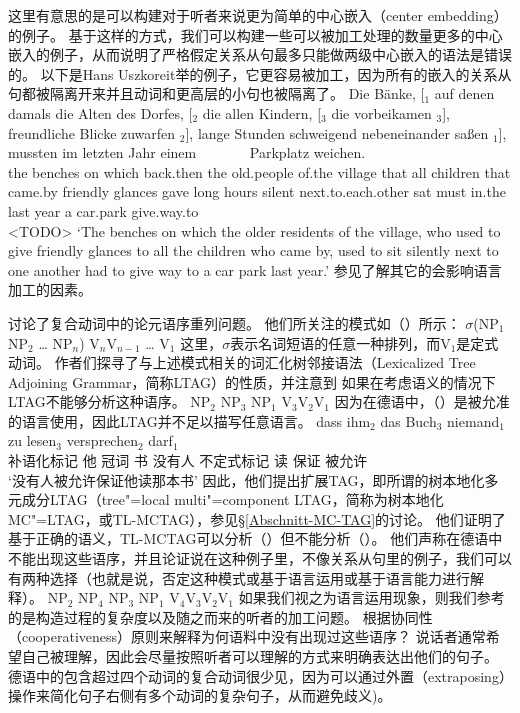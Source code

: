 \noindent
这里有意思的是可以构建对于听者来说更为简单的中心嵌入（center embedding）的例子。
基于这样的方式，我们可以构建一些可以被加工处理的数量更多的中心嵌入的例子，从而说明了严格假定关系从句最多只能做两级中心嵌入的语法是错误的。
以下是Hans Uszkoreit举的例子，它更容易被加工，因为所有的嵌入的关系从句都被隔离开来并且动词和更高层的小句也被隔离了。
\ea
\gll Die Bänke, [$_1$ auf denen damals die Alten des Dorfes, [$_2$ die allen Kindern, [$_3$ die vorbeikamen $_3$], freundliche Blicke zuwarfen $_2$], 
lange Stunden schweigend nebeneinander saßen $_1$], mussten im letzten Jahr einem~~~~~~~ Parkplatz weichen.\\
the benches {} on which back.then the old.people of.the village {} that all children {} that came.by {} friendly glances gave {}
long hours silent next.to.each.other sat {} must in.the last year a car.park give.way.to\\
<TODO>%
\glt `The benches on which the older residents of the village, who used to give friendly glances to all the children who came by, used to sit silently next to one 
another had to give way to a car park last year.'
\z
参见了解其它的会影响语言加工的因素。

\addlines
\citet{JBR2000a}讨论了复合动词中的论元语序重列问题。
他们所关注的模式如（）所示：
\ea
$\sigma$(NP$_1$ NP$_2$ \ldots{} NP$_n$) V$_{n}$V$_{n-1}$ \ldots{} V$_{1}$
\z
这里，$\sigma$表示名词短语的任意一种排列，而V$_{1}$是定式动词。
作者们探寻了与上述模式相关的词汇化树邻接语法（Lexicalized Tree Adjoining Grammar，简称LTAG）的性质，并注意到
如果在考虑语义的情况下LTAG不能够分析这种语序。
\ea
NP$_2$ NP$_3$ NP$_1$ V$_{3}$V$_{2}$V$_{1}$
\z
因为在德语中，（）是被允准的语言使用，因此LTAG并不足以描写任意语言。
\ea
\gll dass ihm$_2$ das Buch$_3$ niemand$_1$ zu lesen$_3$ versprechen$_2$ darf$_1$\\
     补语化标记 他     冠词 书 没有人 不定式标记 读 保证 被允许 \\
\glt `没有人被允许保证他读那本书'
\z
因此，他们提出扩展TAG，即所谓的树本地化多元成分LTAG（{tree"=local multi"=component LTAG}，简称为树本地化MC"=LTAG，或TL-MCTAG），参见\S \ref{Abschnitt-MC-TAG}的讨论。
他们证明了基于正确的语义，TL-MCTAG可以分析（）但不能分析（）。
他们声称在德语中不能出现这些语序，并且论证说在这种例子里，不像关系从句里的例子，我们可以有两种选择（也就是说，否定这种模式或基于语言运用或基于语言能力进行解释）。
\ea
\label{ex-mc-ltag-fails}
NP$_2$ NP$_4$ NP$_3$ NP$_1$ V$_{4}$V$_{3}$V$_{2}$V$_{1}$
\z
如果我们视之为语言运用现象，则我们参考的是构造过程的复杂度以及随之而来的听者的加工问题。
根据协同性（cooperativeness）原则来解释为何语料中没有出现过这些语序？
说话者通常希望自己被理解，因此会尽量按照听者可以理解的方式来明确表达出他们的句子。
德语中的包含超过四个动词的复合动词很少见，因为可以通过外置（extraposing）操作来简化句子右侧有多个动词的复杂句子，从而避免歧义\citealp[]{MuellerLehrbuch1})。

